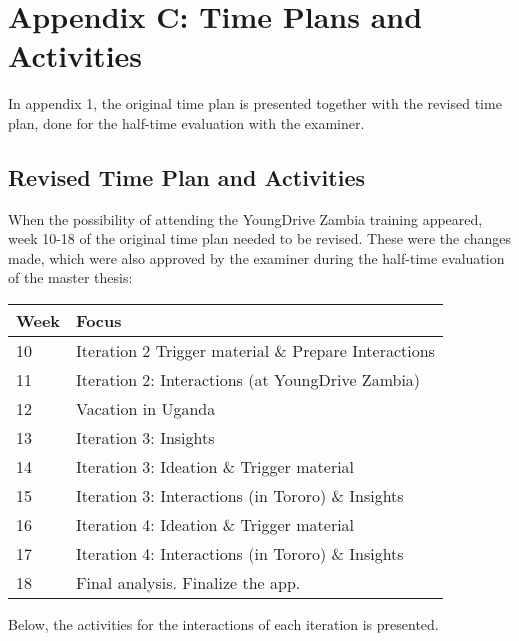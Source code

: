 \chapter{Appendix C: Time Plans and Activities}\label{cha:appendix1}


In appendix 1, the original time plan is presented together with the revised time plan, done for the half-time evaluation with the examiner.



\section{Revised Time Plan and Activities}

When the possibility of attending the YoungDrive Zambia training appeared, week 10-18 of the original time plan needed to be revised. These were the changes made, which were also approved by the examiner during the half-time evaluation of the master thesis:

\begin{center}
    \begin{tabular}{ | l | p{10cm} |}
    \hline
    Week & Focus \\ \hline
    10 & Iteration 2 Trigger material \& Prepare Interactions \\ \hline
    11 & Iteration 2: Interactions (at YoungDrive Zambia) \\ \hline
    12 & Vacation in Uganda \\ \hline
    13 & Iteration 3: Insights \\ \hline
    14 & Iteration 3: Ideation \& Trigger material \\ \hline
    15 & Iteration 3: Interactions (in Tororo) \& Insights \\ \hline
    16 & Iteration 4: Ideation \& Trigger material \\ \hline
    17 & Iteration 4: Interactions (in Tororo) \& Insights \\ \hline
    18 & Final analysis. Finalize the app. \\ \hline
    \end{tabular}
\end{center}

Below, the activities for the interactions of each iteration is presented.


